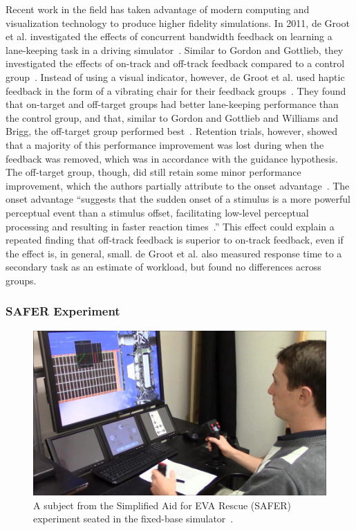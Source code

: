 Recent work in the field has taken advantage of modern computing and visualization technology to produce higher fidelity simulations.
In 2011, de Groot et al. investigated the effects of concurrent bandwidth feedback on learning a lane-keeping task in a driving simulator~\citep{de_groot_effect_2011}.
Similar to Gordon and Gottlieb, they investigated the effects of on-track and off-track feedback compared to a control group~\citep{gordon_effect_1967}.
Instead of using a visual indicator, however, de Groot et al. used haptic feedback in the form of a vibrating chair for their feedback groups~\citep{de_groot_effect_2011}.
They found that on-target and off-target groups had better lane-keeping performance than the control group, and that, similar to Gordon and Gottlieb and Williams and Brigg, the off-target group performed best~\citep{gordon_effect_1967,williams_-target_1962}.
Retention trials, however, showed that a majority of this performance improvement was lost during when the feedback was removed, which was in accordance with the guidance hypothesis.
The off-target group, though, did still retain some minor performance improvement, which the authors partially attribute to the onset advantage~\citep{fischer_differential_2008}.
The onset advantage ``suggests that the sudden onset of a stimulus is a more powerful perceptual event than a stimulus offset, facilitating low-level perceptual processing and resulting in faster reaction times~\citep{de_groot_effect_2011}.''
This effect could explain a repeated finding that off-track feedback is superior to on-track feedback, even if the effect is, in general, small.
de Groot et al. also measured response time to a secondary task as an estimate of workload, but found no differences across groups.

\subsubsection{SAFER Experiment}
\begin{figure}[b!]
    \begin{center}
        \includegraphics[width=0.8\linewidth]{figures/AR/SAFER_DangerChris.jpg}
        \caption[Simplified Aid for EVA Rescue (SAFER) experiment subject seated in the fixed-base simulator]{A subject from the Simplified Aid for EVA Rescue (SAFER) experiment seated in the fixed-base simulator~\citep{karasinski_real-time_2016}.}
        \label{figure:safersim}
    \end{center}
\end{figure}

